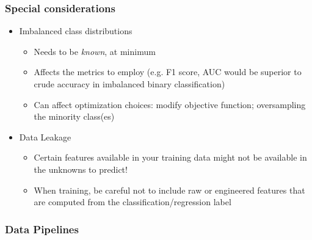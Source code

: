 \documentclass[10pt,landscape,letterpaper]{cheatsheet}
\begin{document}
\begin{multicols}{3}
\subsubsection{Special considerations}

\begin{itemize}
    \item Imbalanced class distributions
    \begin{itemize}
        \item Needs to be \emph{known}, at minimum
        \item Affects the metrics to employ (e.g. F1 score, AUC would be superior to crude accuracy in imbalanced binary classification)
        \item Can affect optimization choices: modify objective function; oversampling the minority class(es)
    \end{itemize}
    \item Data Leakage
    \begin{itemize}
        \item Certain features available in your training data might not be available in the unknowns to predict!
        \item When training, be careful not to include raw or engineered features that are computed from the classification/regression label
    \end{itemize}
\end{itemize}

\subsubsection{Data Pipelines}


\end{multicols}
\end{document}

